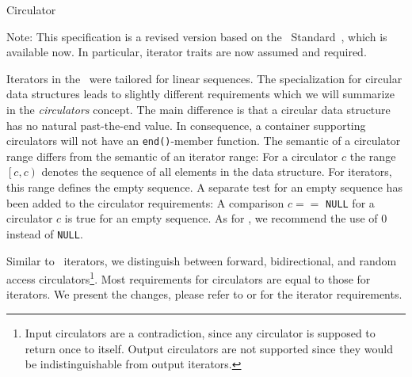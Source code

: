 
\begin{ccRefConcept}{Circulator}

\ccDefinition


Note: This specification is a revised version based on the \CC\ 
Standard~\cite{c-isplc-98}, which is available now. In particular,
iterator traits are now assumed and required.

Iterators in the \stl\ were tailored for linear sequences. The
specialization for circular data structures leads to slightly
different requirements which we will summarize in the {\em
  circulators\/} concept. The main difference is that a circular data
structure has no natural past-the-end value. In consequence, a
container supporting circulators will not have an {\tt end()}-member
function. The semantic of a circulator range differs from the semantic
of an iterator range: For a circulator $c$ the range $\left[c,
  c\right)$ denotes the sequence of all elements in the data
structure. For iterators, this range defines the empty sequence. A
separate test for an empty sequence has been added to the circulator
requirements: A comparison $c ==$ {\tt NULL} for a circulator $c$ is
true for an empty sequence. As for \CC, we recommend the use of 0
instead of {\tt NULL}.

Similar to \stl\ iterators, we distinguish between forward,
bidirectional, and random access circulators\footnote{Input
  circulators are a contradiction, since any circulator is supposed to
  return once to itself.  Output circulators are not supported since
  they would be indistinguishable from output iterators.}. Most
requirements for circulators are equal to those for iterators. We
present the changes, please refer to \cite[chapter 18]{ms-strg-96} or
\cite{c-isplc-98} for the iterator requirements.


\end{ccRefConcept}
